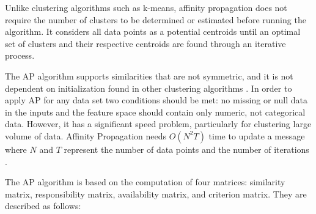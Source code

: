 Unlike clustering algorithms such as k-means, affinity propagation does not require the number of clusters to be determined or estimated before running the algorithm. It considers all data points as a potential centroids until an optimal set of clusters and their respective centroids are found through an iterative process. %




The AP algorithm supports similarities that are not symmetric, and it is not dependent on initialization found in other clustering algorithms \cite{refianti2017time}. In order to apply AP for any data set two conditions should be met: no missing or null data in the inputs and the feature space should contain only numeric, not categorical data. However, it has a significant speed problem, particularly for clustering large volume of data. Affinity Propagation needs $O(N^2T)$ time to update a message where $N$ and $T$ represent the number of data points and the number of iterations \cite{frey2007clustering}. 


The AP algorithm is based on the computation of four matrices: similarity matrix, responsibility matrix, availability matrix, and criterion matrix. They are described as follows:

